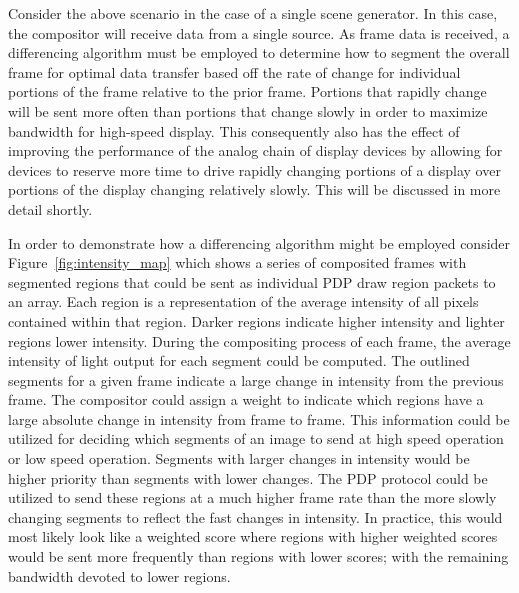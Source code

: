     Consider the above scenario in the case of a single scene generator. In this case, the compositor will receive data from a single source. As frame data is received, a differencing algorithm must be employed to determine how to segment the overall frame for optimal data transfer based off the rate of change for individual portions of the frame relative to the prior frame. Portions that rapidly change will be sent more often than portions that change slowly in order to maximize bandwidth for high-speed display. This consequently also has the effect of improving the performance of the analog chain of display devices by allowing for devices to reserve more time to drive rapidly changing portions of a display over portions of the display changing relatively slowly. This will be discussed in more detail shortly.

    In order to demonstrate how a differencing algorithm might be employed consider Figure~\ref{fig:intensity_map} which shows a series of composited frames with segmented regions that could be sent as individual PDP draw region packets to an array. Each region is a representation of the average intensity of all pixels contained within that region. Darker regions indicate higher intensity and lighter regions lower intensity. During the compositing process of each frame, the average intensity of light output for each segment could be computed. The outlined segments for a given frame indicate a large change in intensity from the previous frame. The compositor could assign a weight to indicate which regions have a large absolute change in intensity from frame to frame. This information could be utilized for deciding which segments of an image to send at high speed operation or low speed operation. Segments with larger changes in intensity would be higher priority than segments with lower changes. The PDP protocol could be utilized to send these regions at a much higher frame rate than the more slowly changing segments to reflect the fast changes in intensity. In practice, this would most likely look like a weighted score where regions with higher weighted scores would be sent more frequently than regions with lower scores; with the remaining bandwidth devoted to lower regions.


